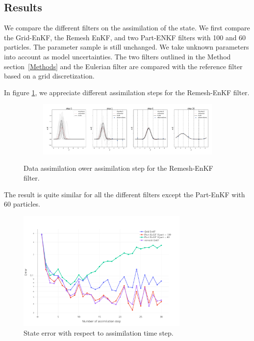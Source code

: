 \subsection{Results}

We compare the different filters on the assimilation of the state. We first compare the Grid-EnKF, the Remesh EnKF, and two Part-ENKF filters with 100 and 60 particles. The parameter sample is still unchanged. We take unknown parameters into account as model uncertainties. The two filters outlined in the Method section~\ref{Methods} and the Eulerian filter are compared with the reference filter based on a grid discretization.

In figure \ref{fig:1d_error_time}, we appreciate different assimilation steps for the Remesh-EnKF filter.


\begin{figure}
	\centering
	\begin{subfigure}{\textwidth}
		\includegraphics[width=\textwidth]{images/app1d/wo_calibration/remesh_EnKF.pdf}
	\end{subfigure}
	\caption{Data assimilation ower assimilation step for the Remesh-EnKF filter.}
\end{figure}

The result is quite similar for all the different filters except the Part-EnKF with 60 particles.

\begin{figure}
	\centering
	\includegraphics[width=0.75\textwidth]{images/app1d/wo_calibration/state_error.png}
	\caption{State error with respect to assimilation time step.}
	\label{fig:1d_error_time}
\end{figure}

